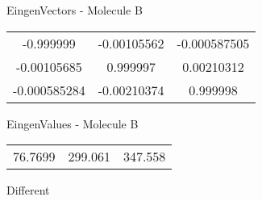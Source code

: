 \begin{multicols}{2}
\begin{center}
\vtab
 EingenVectors - Molecule B     \\
\vtab
\begin{tabular}{|c c c|}
-0.999999	 & 	-0.00105562	 & 	-0.000587505	 \\
-0.00105685	 & 	0.999997	 & 	0.00210312	 \\
-0.000585284	 & 	-0.00210374	 & 	0.999998
\end{tabular}

\vtab
 EingenValues - Molecule B     \\
\vtab
\begin{tabular}{|c c c|}
76.7699	 & 	299.061	 & 	347.558	 \\
\end{tabular}

\end{center}
\end{multicols}
\begin{center}
\vtab
\vtab
\textcolor{NavyBlue}{\Large Different}
\end{center}

 \newpage

